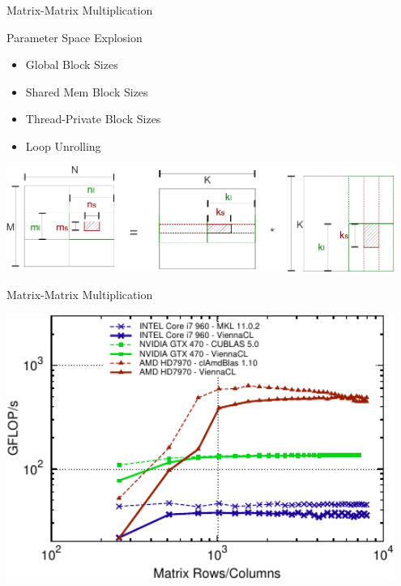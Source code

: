 \begin{frame}{Matrix-Matrix Multiplication}
 \begin{block}{Parameter Space Explosion}
  \begin{itemize}
   \item Global Block Sizes
   \item Shared Mem Block Sizes
   \item Thread-Private Block Sizes
   \item Loop Unrolling
  \end{itemize}
 \end{block}
 
   \begin{center}
   \includegraphics[width=0.95\textwidth]{figures/MatrixMatrixProduct}
  \end{center}

\end{frame}



\begin{frame}{Matrix-Matrix Multiplication}
  \begin{center}
   \includegraphics[width=0.95\textwidth]{figures/dgemm}
  \end{center}
\end{frame}

